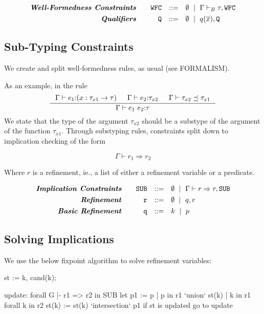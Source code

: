 \documentclass[10pt,a4paper]{article}
\newcommand\hastype[3]{\ensuremath{#1 \vdash #2 \colon #3}}
\newcommand\biswellformed[2]{\ensuremath{#1 \vdash_B #2}}
\newcommand\issubtype[3]{\ensuremath{#1 \vdash #2 \preceq #3}}
\newcommand\issubref[3]{\ensuremath{#1 \vdash #2 \Rightarrow #3}}
\begin{document}
$$
\begin{array}{rrcl}
\emphbf{Well-Formedness Constraints} \quad 
  & \texttt{WFC}
  & ::= 
  &     \emptyset \spmid \biswellformed{\Gamma}{\tau},\texttt{WFC}    
  \\[0.05in] 

\emphbf{Qualifiers} \quad 
  & \texttt{Q}
  & ::= 
  &      \emptyset \spmid q(\overline{x}), \texttt{Q}
\end{array}
$$


\subsection*{Sub-Typing Constraints}
We create and split well-formedness rules, as usual (see FORMALISM).

As an example, in the rule
$$
\inference{
	\hastype{\Gamma}{e_1}{(x:\tau_{x1} \rightarrow \tau)} &&
	\hastype{\Gamma}{e_2}{\tau_{x2}} &&
	\issubtype{\Gamma}{\tau_{x2}}{\tau_{x1}}
}{
	\hastype{\Gamma}{e_1 \ e_2}{\tau}
}
$$
We state that the type of the argument $\tau_{x2}$ should be a substype
of the argument of the function $\tau_{x1}$.
% 
Through substyping rules, constraints split down to implication checking of the form

$$\issubref{\Gamma}{r_1}{r_2}$$

Where $r$ is a refinement, ie., a list of either a refinement variable or a predicate.

$$
\begin{array}{rrcl}
\emphbf{Implication Constraints} \quad 
  & \texttt{SUB}
  & ::= 
  &     \emptyset \spmid \issubref{\Gamma}{r}{r},\texttt{SUB}    
  \\[0.05in] 

\emphbf{Refinement} \quad 
  & \texttt{r}
  & ::= 
  &     \emptyset \spmid q, r    
  \\[0.05in] 

\emphbf{Basic Refinement} \quad 
  & \texttt{q}
  & ::= 
  &      k \spmid p
\end{array}
$$

\subsection*{Solving Implications}
We use the below fixpoint algorithm to solve refinement variables:

\begin{code}
st := {k, cand(k)};

update:
 forall G |- r1 => r2 in SUB
  let p1 := {p | p in r1} `union` {st(k) | k in r1}
  forall k in r2 
   st(k) := st(k) `intersection` p1
 if st is updated go to update	    
\end{code}
\end{document}
